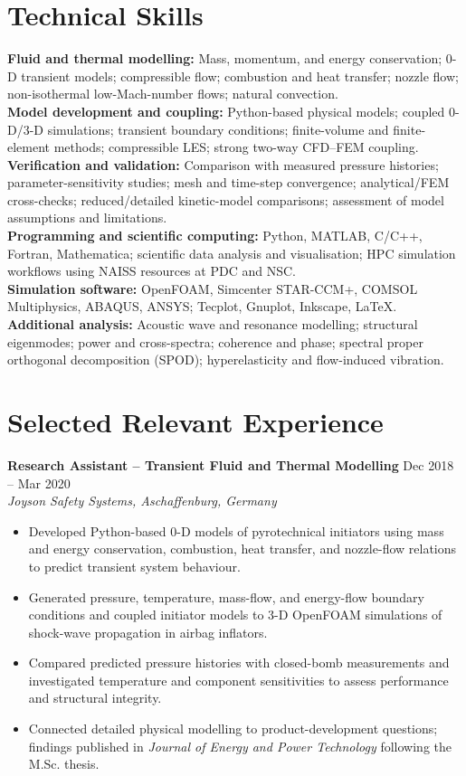 \documentclass[a4paper,10pt]{article}
\begin{document}
\section{Technical Skills}
\textbf{Fluid and thermal modelling:} Mass, momentum, and energy conservation; 0-D transient models;
compressible flow; combustion and heat transfer; nozzle flow; non-isothermal low-Mach-number flows;
natural convection.\\[3pt]
\textbf{Model development and coupling:} Python-based physical models; coupled 0-D/3-D simulations;
transient boundary conditions; finite-volume and finite-element methods; compressible LES;
strong two-way CFD--FEM coupling.\\[3pt]
\textbf{Verification and validation:} Comparison with measured pressure histories; parameter-sensitivity
studies; mesh and time-step convergence; analytical/FEM cross-checks; reduced/detailed kinetic-model
comparisons; assessment of model assumptions and limitations.\\[3pt]
\textbf{Programming and scientific computing:} Python, MATLAB, C/C++, Fortran, Mathematica;
scientific data analysis and visualisation; HPC simulation workflows using NAISS resources at PDC and NSC.\\[3pt]
\textbf{Simulation software:} OpenFOAM, Simcenter STAR-CCM+, COMSOL Multiphysics, ABAQUS,
ANSYS; Tecplot, Gnuplot, Inkscape, LaTeX.\\[3pt]
\textbf{Additional analysis:} Acoustic wave and resonance modelling; structural eigenmodes;
power and cross-spectra; coherence and phase; spectral proper orthogonal decomposition (SPOD);
hyperelasticity and flow-induced vibration.

\section{Selected Relevant Experience}
\textbf{Research Assistant -- Transient Fluid and Thermal Modelling}
\hfill Dec 2018 -- Mar 2020\\
\textit{Joyson Safety Systems, Aschaffenburg, Germany}
\begin{itemize}
\item Developed Python-based 0-D models of pyrotechnical initiators using mass and energy
conservation, combustion, heat transfer, and nozzle-flow relations to predict transient system behaviour.
\item Generated pressure, temperature, mass-flow, and energy-flow boundary conditions and coupled
initiator models to 3-D OpenFOAM simulations of shock-wave propagation in airbag inflators.
\item Compared predicted pressure histories with closed-bomb measurements and investigated
temperature and component sensitivities to assess performance and structural integrity.
\item Connected detailed physical modelling to product-development questions; findings published in
\textit{Journal of Energy and Power Technology} following the M.Sc. thesis.
\end{itemize}
\end{document}
